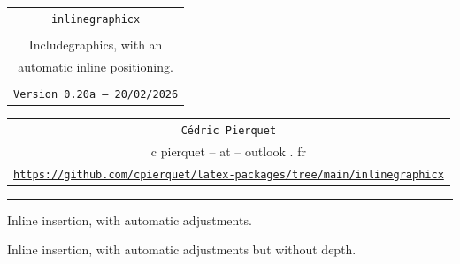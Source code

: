 \documentclass[11pt,a4paper]{ltxdoc}
\def\TPversion{0.20a}
\def\TPdate{20/02/2026}
\begin{document}
\thispagestyle{empty}

\begin{center}
	\begin{minipage}{0.88\linewidth}
		\begin{tcolorbox}[colframe=yellow,colback=yellow!15]
			\begin{center}
				\renewcommand{\arraystretch}{1.25}%
				\begin{tabular}{c}
					{\Huge \texttt{inlinegraphicx}}\\
					\\
					{\LARGE Includegraphics, with an} \\
					{\LARGE automatic inline positioning.} \\
					\\
					{\small \texttt{Version \TPversion{} -- \TPdate}}
				\end{tabular}
			\end{center}
		\end{tcolorbox}
	\end{minipage}
\end{center}

\begin{center}
	\begin{tabular}{c}
		\texttt{Cédric Pierquet}\\
		{\ttfamily c pierquet -- at -- outlook . fr}\\
		\texttt{\url{https://github.com/cpierquet/latex-packages/tree/main/inlinegraphicx}} \\
	\end{tabular}
\end{center}

\hrule

\vfill

\begin{tcolorbox}[colframe=lightgray,colback=lightgray!5]
{Inline insertion,  with automatic adjustments.}
\end{tcolorbox}

\begin{tcolorbox}[colframe=lightgray,colback=lightgray!5]
\end{tcolorbox}

\begin{tcolorbox}[colframe=lightgray,colback=lightgray!5]
{Inline insertion,  with automatic adjustments but without depth.}
\end{tcolorbox}
\end{document}
